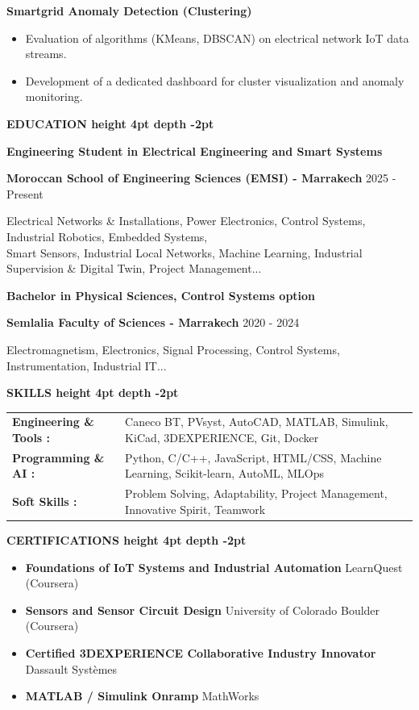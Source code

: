 \documentclass[10pt,a4paper]{altacv}
\renewcommand{\cvsection}[2][]{%
  \vspace{3pt}%
  {\color{heading}\LARGE\bfseries #2 \hspace{0.2em}\leaders\vrule height 4pt depth -2pt\hfill\mbox{}}\par\vspace{2pt}
}
\renewcommand{\cvevent}[4]{%
  {\large\bfseries\color{accent}#1\par}
  \smallskip\normalsize
  \ifstrequal{#2}{}{}{%
    \textbf{\color{emphasis}#2\ifstrequal{#4}{}{}{ - #4}}%
  }%
  \hfill
  \ifstrequal{#3}{}{}{{\small#3}}%
  \par\smallskip
}
\begin{document}
{\large\bfseries\color{accent} Smartgrid Anomaly Detection (Clustering)}\\[0.05cm]
\begin{itemize}
  \item Evaluation of algorithms (KMeans, DBSCAN) on electrical network IoT data streams.
  \item Development of a dedicated dashboard for cluster visualization and anomaly monitoring.
\end{itemize}

\cvsection{EDUCATION}
\cvevent{Engineering Student in Electrical Engineering and Smart Systems}{Moroccan School of Engineering Sciences (EMSI)}{2025 - Present}{Marrakech}
\small Electrical Networks \& Installations, Power Electronics, Control Systems, Industrial Robotics, Embedded Systems,\\
\small Smart Sensors, Industrial Local Networks, Machine Learning, Industrial Supervision \& Digital Twin, Project Management...

\cvevent{Bachelor in Physical Sciences, Control Systems option}{Semlalia Faculty of Sciences}{2020 - 2024}{Marrakech}
\small Electromagnetism, Electronics, Signal Processing, Control Systems, Instrumentation, Industrial IT...

\cvsection{SKILLS}
\begin{tabular}{@{}ll@{}}
\textbf{Engineering \& Tools :} & Caneco BT, PVsyst, AutoCAD, MATLAB, Simulink, KiCad, 3DEXPERIENCE, Git, Docker \\[2pt]
\textbf{Programming \& AI :} & Python, C/C++, JavaScript, HTML/CSS, Machine Learning, Scikit-learn, AutoML, MLOps \\[2pt]
\textbf{Soft Skills :} & Problem Solving, Adaptability, Project Management, Innovative Spirit, Teamwork \\
\end{tabular}

\cvsection{CERTIFICATIONS}
\begin{itemize}[leftmargin=*, label=\textbullet, itemsep=2pt]
  \item \textbf{Foundations of IoT Systems and Industrial Automation} \hfill {\color{emphasis}LearnQuest (Coursera)}
  \item \textbf{Sensors and Sensor Circuit Design} \hfill {\color{emphasis}University of Colorado Boulder (Coursera)}
  \item \textbf{Certified 3DEXPERIENCE Collaborative Industry Innovator} \hfill {\color{emphasis}Dassault Systèmes}
  \item \textbf{MATLAB / Simulink Onramp} \hfill {\color{emphasis}MathWorks}
\end{itemize}
\end{document}
